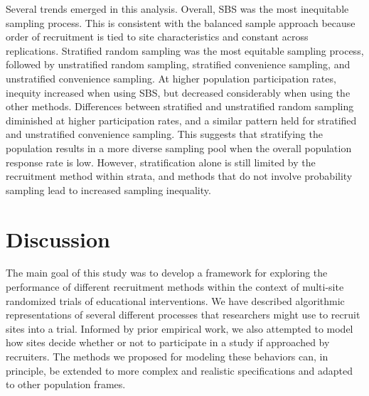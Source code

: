 \documentclass[
  english,
  man,floatsintext]{apa6}
\begin{document}
Several trends emerged in this analysis. Overall, SBS was the most inequitable sampling process. This is consistent with the balanced sample approach because order of recruitment is tied to site characteristics and constant across replications. Stratified random sampling was the most equitable sampling process, followed by unstratified random sampling, stratified convenience sampling, and unstratified convenience sampling.
At higher population participation rates, inequity increased when using SBS, but decreased considerably when using the other methods. Differences between stratified and unstratified random sampling diminished at higher participation rates, and a similar pattern held for stratified and unstratified convenience sampling. This suggests that stratifying the population results in a more diverse sampling pool when the overall population response rate is low.
However, stratification alone is still limited by the recruitment method within strata, and methods that do not involve probability sampling lead to increased sampling inequality.

\hypertarget{discussion}{%
\section*{Discussion}\label{discussion}}

The main goal of this study was to develop a framework for exploring the performance of different recruitment methods within the context of multi-site randomized trials of educational interventions. We have described algorithmic representations of several different processes that researchers might use to recruit sites into a trial. Informed by prior empirical work, we also attempted to model how sites decide whether or not to participate in a study if approached by recruiters. The methods we proposed for modeling these behaviors can, in principle, be extended to more complex and realistic specifications and adapted to other population frames.
\end{document}
